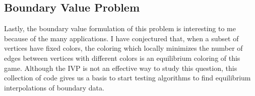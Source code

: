 \documentclass[]{article}
\begin{document}
\subsection{Boundary Value Problem}
Lastly, the boundary value formulation of this problem is interesting to me because of the many applications. I have conjectured that, when a subset of vertices have fixed colors, the coloring which locally minimizes the number of edges between vertices with different colors is an equilibrium coloring of this game. Although the IVP is not an effective way to study this question, this collection of code gives us a basis to start testing algorithms to find equilibrium interpolations of boundary data.
\end{document}
